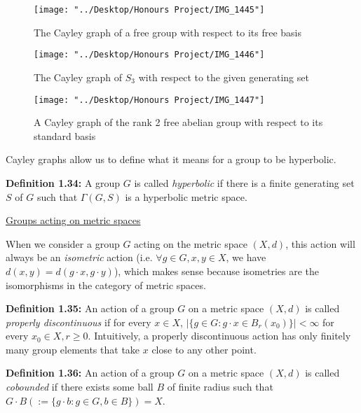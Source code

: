 \documentclass[12pt]{article}
\newcommand{\vs}{\vskip10pt}
\begin{document}
\begin{figure} [H]
	\centering
	\texttt{[image: "../Desktop/Honours Project/IMG\_1445"]}
	\caption{The Cayley graph of a free group with respect to its free basis}
	\label{fig:img1445}
\end{figure}
	\vs 
\begin{figure} [H]
	\centering
	\texttt{[image: "../Desktop/Honours Project/IMG\_1446"]}
	\caption{The Cayley graph of $S_3$ with respect to the given generating set}
	\label{fig:img1446}
\end{figure}
	
\begin{figure} [H]
	\centering
	\texttt{[image: "../Desktop/Honours Project/IMG\_1447"]}
	\caption{A Cayley graph of the rank 2 free abelian group with respect to its standard basis}
	\label{fig:img1447}
\end{figure}
	Cayley graphs allow us to define what it means for a group to be hyperbolic. 
	
	\vs 
	
	\textbf{Definition 1.34: } A group $G$ is called \textit{hyperbolic} if there is a finite generating set $S$ of $G$ such that $\Gamma(G, S)$ is a hyperbolic metric space. 
	
	\vs
	
	\underline{Groups acting on metric spaces}
	
	\vs 
	
	When we consider a group $G$ acting on the metric space $(X,d)$, this action will always be an \textit{isometric} action (i.e. $\forall g \in G, x,y \in X$, we have $d(x, y) = d(g \cdot x, g \cdot y)$), which makes sense because isometries are the isomorphisms in the category of metric spaces. 
	
	\vs 
	
	\textbf{Definition 1.35: } An action of a group $G$ on a metric space $(X,d)$ is called \textit{properly discontinuous} if for every $x \in X$, $\vert \{g \in G: g \cdot x \in B_r(x_0)\}\vert < \infty$ for every $x_0 \in X, r \geq 0$. Intuitively, a properly discontinuous action has only finitely many group elements that take $x$ close to any other point. 
	
	\vs 
	
	\textbf{Definition 1.36: } An action of a group $G$ on a metric space $(X,d)$ is called \textit{cobounded} if there exists some ball $B$ of finite radius such that $G\cdot B (:= \{g \cdot b: g \in G, b \in B\}) = X$. 
	
\end{document}
